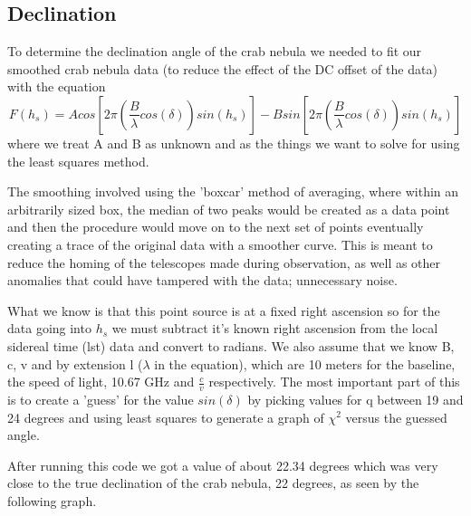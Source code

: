 \documentclass[12 pt]{article}
\begin{document}
\subsection*{Declination}
To determine the declination angle of the crab nebula we needed to fit
our smoothed crab nebula data (to reduce the effect of the DC offset of the data) with the equation
\begin{equation}
  F(h_{s}) =
  Acos[2\pi(\frac{B}{\lambda}cos(\delta))sin(h_{s})]-Bsin[2\pi(\frac{B}{\lambda}cos(\delta))sin(h_{s})]
\end{equation}
where we treat A and B as unknown and as the things we want to solve for
using the least
squares method. \par
The smoothing involved using the 'boxcar' method of averaging, where
within an arbitrarily sized box, the median of two peaks would be
created as a data point and then the procedure would move on to the next set of points eventually creating a
trace of the original data with a smoother curve. This is meant to
reduce the homing of the telescopes made during
observation, as well as other anomalies that could have tampered with the
data; unnecessary noise. \par
What we know is that this point source is at a fixed right ascension so
for the data going into $h_{s}$ we must subtract it's known right
ascension from the local sidereal time (lst) data and convert to radians. We also assume that
we know B, c, v and by extension l ($\lambda$ in the equation), which are 10 meters for the baseline,
the speed of light, 10.67 GHz and $\frac{c}{v}$ respectively. The most
important part of this is to create a 'guess' for the value
$sin(\delta)$ by picking values for q between 19 and 24 degrees and
using least squares to  generate a graph of $\chi^2$ versus the guessed
angle.\par
After running this code we got a value of about 22.34 degrees which
was very close to the true declination of the crab nebula, 22
degrees, as seen by the following graph.
\end{document}
